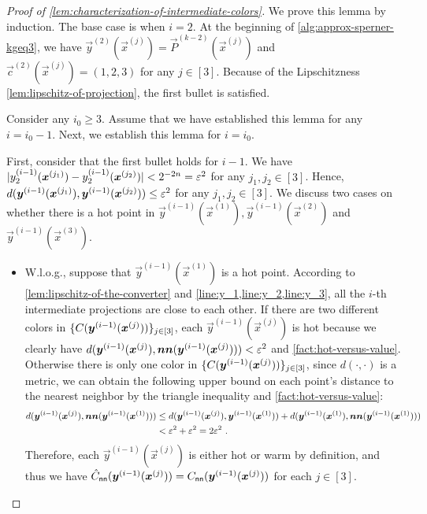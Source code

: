 \begin{proof}[Proof of \cref{lem:characterization-of-intermediate-colors}]
    We prove this lemma by induction.
    The base case is when $i=2$. 
    At the beginning of \cref{alg:approx-sperner-kgeq3}, we have $\vec{y}^{(2)}(\vec{x}^{(j)})=\vec{P}^{(k-2)}(\vec{x}^{(j)})$ and $\vec{c}^{(2)}(\vec{x}^{(j)})=(1,2,3)$ for any $j\in [3]$. 
    Because of the Lipschitzness \cref{lem:lipschitz-of-projection}, the first bullet is satisfied. 

    Consider any $i_0\geq 3$. Assume that we have established this lemma for any $i=i_0-1$. 
    Next, we establish this lemma for $i=i_0$.

    First, consider that the first bullet holds for $i-1$. We have $\abstxt{y_2^{(i-1)}(\vec{x}^{(j_1)})-y_2^{(i-1)}(\vec{x}^{(j_2)})}< 2^{-2n}=\eps^2$ for any $j_1,j_2\in [3]$. 
    Hence, $d(\vec{y}^{(i-1)}(\vec{x}^{(j_1)}), \vec{y}^{(i-1)}(\vec{x}^{(j_2)}))\leq \eps^2$ for any $j_1,j_2\in [3]$. 
    We discuss two cases on whether there is a hot point in $\vec{y}^{(i-1)}(\vec{x}^{(1)}), \vec{y}^{(i-1)}(\vec{x}^{(2)})$ and $\vec{y}^{(i-1)}(\vec{x}^{(3)})$. 
    \begin{itemize}[itemsep=0.2em,topsep=0.5em]
        \item W.l.o.g., suppose that $\vec{y}^{(i-1)}(\vec{x}^{(1)})$ is a hot point. 
        According to \cref{lem:lipschitz-of-the-converter} and \cref{line:y_1,line:y_2,line:y_3}, all the $i$-th intermediate projections are close to each other. 
        If there are two different colors in $\settxt{C(\vec{y}^{(i-1)}(\vec{x}^{(j)}))}_{j\in [3]}$, each $\vec{y}^{(i-1)}(\vec{x}^{(j)})$ is hot because we clearly have $d(\vec{y}^{(i-1)}(\vec{x}^{(j)}),\nn(\vec{y}^{(i-1)}(\vec{x}^{(j)})))<\eps^2$ and \cref{fact:hot-versus-value}. 
        Otherwise there is only one color in $\settxt{C(\vec{y}^{(i-1)}(\vec{x}^{(j)}))}_{j\in [3]}$, since $d(\cdot, \cdot)$ is a metric, we can obtain the following upper bound on each point's distance to the nearest neighbor by the triangle inequality and \cref{fact:hot-versus-value}:
        \begin{align*}
            d(\vec{y}^{(i-1)}(\vec{x}^{(j)}), \nn(\vec{y}^{(i-1)}(\vec{x}^{(1)}))) &\leq d(\vec{y}^{(i-1)}(\vec{x}^{(j)}), \vec{y}^{(i-1)}(\vec{x}^{(1)})) + d(\vec{y}^{(i-1)}(\vec{x}^{(1)}), \nn(\vec{y}^{(i-1)}(\vec{x}^{(1)}))) \\
            &< \eps^2+\eps^2 =  2\eps^2~.
        \end{align*}
        Therefore, each $\vec{y}^{(i-1)}(\vec{x}^{(j)})$ is either hot or warm by definition, and thus we have $\hat{C}_{\sf nn}(\vec{y}^{(i-1)}(\vec{x}^{(j)}))=C_{\sf nn}(\vec{y}^{(i-1)}(\vec{x}^{(j)}))$ for each $j\in [3]$. 

\end{itemize}
\end{proof}
